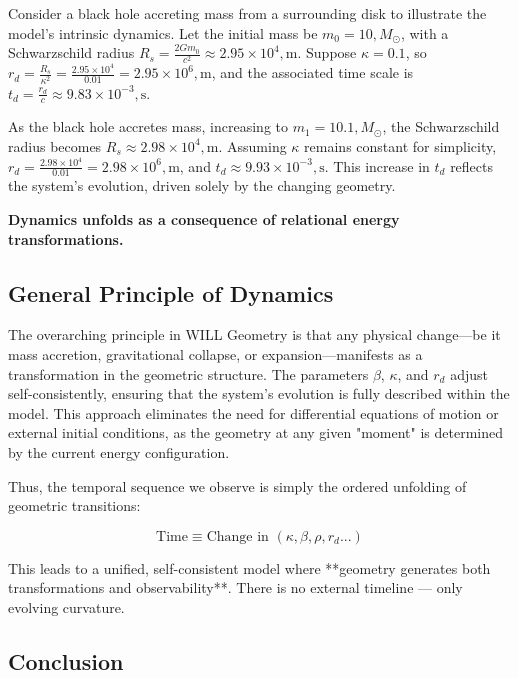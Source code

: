 \documentclass[12pt, a4paper]{article}
\begin{document}
Consider a black hole accreting mass from a surrounding disk to illustrate the model's intrinsic dynamics. Let the initial mass be $m_0 = 10 , M_\odot$, with a Schwarzschild radius $R_s = \frac{2 G m_0}{c^2} \approx 2.95 \times 10^4 , \text{m}$. Suppose $\kappa = 0.1$, so $r_{d} = \frac{R_s}{\kappa^2} = \frac{2.95 \times 10^4}{0.01} = 2.95 \times 10^6 , \text{m}$, and the associated time scale is $t_{d} = \frac{r_{d}}{c} \approx 9.83 \times 10^{-3} , \text{s}$.

As the black hole accretes mass, increasing to $m_1 = 10.1 , M_\odot$, the Schwarzschild radius becomes $R_s \approx 2.98 \times 10^4 , \text{m}$. Assuming $\kappa$ remains constant for simplicity, $r_{d} = \frac{2.98 \times 10^4}{0.01} = 2.98 \times 10^6 , \text{m}$, and $t_{d} \approx 9.93 \times 10^{-3} , \text{s}$. This increase in $t_{d}$ reflects the system's evolution, driven solely by the changing geometry.
\begin{tcolorbox}[colback=gray!5,colframe=black!40!black,title=No differential equations are required:]
 \textbf{Dynamics unfolds as a consequence of relational energy transformations.}
\end{tcolorbox}

\subsection{General Principle of Dynamics}

The overarching principle in WILL Geometry is that any physical change—be it mass accretion, gravitational collapse, or expansion—manifests as a transformation in the geometric structure. The parameters \(\beta\), \(\kappa\), and \(r_{d}\) adjust self-consistently, ensuring that the system's evolution is fully described within the model. This approach eliminates the need for differential equations of motion or external initial conditions, as the geometry at any given "moment" is determined by the current energy configuration.

Thus, the temporal sequence we observe is simply the ordered unfolding of geometric transitions:

\[
\boxed{
\text{Time} \equiv \text{Change in } (\kappa, \beta, \rho, r_{d}...)
}
\]

 This leads to a unified, self-consistent model where **geometry generates both transformations and observability**. There is no external timeline — only evolving curvature.
 
\subsection{Conclusion}
\end{document}

